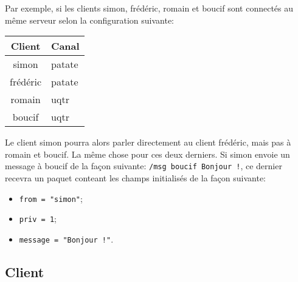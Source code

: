 \documentclass[12pt,french]{article}
\begin{document}
                Par exemple, si les clients simon, frédéric, romain et boucif sont connectés au même
                serveur selon la configuration suivante:
                \begin{table}[H]
                    \centering
                    \begin{tabular}{|c|l|}
                        \hline {\bf Client}&{\bf Canal}\\
                        \hline simon& patate\\
                        \hline frédéric&patate\\
                        \hline romain&uqtr\\
                        \hline boucif&uqtr\\
                        \hline
                    \end{tabular}
                \end{table}
                Le client simon pourra alors parler directement au client frédéric, mais pas à
                romain et boucif. La même chose pour ces deux derniers. Si simon envoie un message à
                boucif de la façon suivante: {\tt /msg boucif Bonjour !}, ce dernier recevra un
                paquet conteant les champs initialisés de la façon suivante:
                \begin{itemize}
                    \item {\tt from = "simon"};
                    \item {\tt priv = 1};
                    \item {\tt message = "Bonjour !"}.
                \end{itemize}

        \subsection{Client} %
        \label{sub:client}

\end{document}
